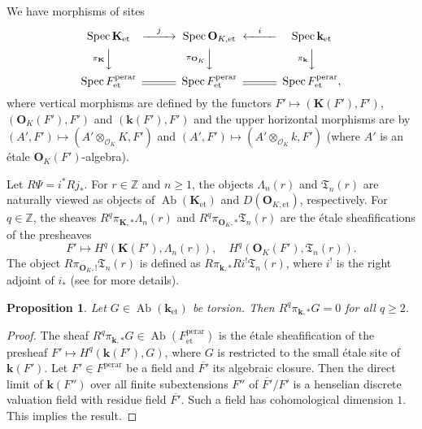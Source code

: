 \documentclass{amsart}
\newtheorem{Prop}[Thm]{Proposition}
\theoremstyle{remark}
\numberwithin{equation}{section}
\newcommand{\Order}{\mathcal{O}}
\newcommand{\tensor}{\mathbin{\otimes}}
\newcommand{\closure}[1]{\overline{#1}}
\newcommand{\Z}{\mathbb{Z}}
\newcommand{\et}{\mathrm{et}}
\newcommand{\perar}{\mathrm{perar}}
\newcommand{\alg}[1]{\mathbf{#1}}
\DeclareMathOperator{\Spec}{Spec}
\DeclareMathOperator{\Ab}{Ab}
\begin{document}
We have morphisms of sites
	\[
		\begin{CD}
				\Spec \alg{K}_{\et}
			@> j >>
				\Spec \alg{O}_{K, \et}
			@< i <<
				\Spec \alg{k}_{\et}
			\\
			@V \pi_{\alg{K}} VV
			@V \pi_{\alg{O}_{K}} VV
			@V \pi_{\alg{k}} VV
			\\
				\Spec F^{\perar}_{\et}
			@=
				\Spec F^{\perar}_{\et}
			@=
				\Spec F^{\perar}_{\et},
		\end{CD}
	\]
where vertical morphisms are defined by the functors
$F' \mapsto (\alg{K}(F'), F')$, $(\alg{O}_{K}(F'), F')$ and $(\alg{k}(F'), F')$
and the upper horizontal morphisms are by
$(A', F') \mapsto (A' \tensor_{\Order_{K}} K, F')$ and
$(A', F') \mapsto (A' \tensor_{\Order_{K}} k, F')$
(where $A'$ is an \'etale $\alg{O}_{K}(F')$-algebra).

Let $R \Psi = i^{\ast} R j_{\ast}$.
For $r \in \Z$ and $n \ge 1$, the objects
$\Lambda_{n}(r)$ and $\mathfrak{T}_{n}(r)$ are naturally viewed as
objects of $\Ab(\alg{K}_{\et})$ and $D(\alg{O}_{K, \et})$, respectively.
For $q \in \Z$, the sheaves $R^{q} \pi_{\alg{K}, \ast} \Lambda_{n}(r)$
and $R^{q} \pi_{\alg{O}_{K}, \ast} \mathfrak{T}_{n}(r)$ are the \'etale sheafifications of the presheaves
	\[
			F'
		\mapsto
			H^{q}(\alg{K}(F'), \Lambda_{n}(r)),
		\quad
			H^{q}(\alg{O}_{K}(F'), \mathfrak{T}_{n}(r)).
	\]
The object $R \pi_{\alg{O}_{K}, !} \mathfrak{T}_{n}(r)$ is defined as
$R \pi_{\alg{k}, \ast} R i^{!} \mathfrak{T}_{n}(r)$,
where $i^{!}$ is the right adjoint of $i_{\ast}$
(see \cite[Section 4.3]{Suz24} for more details).

\begin{Prop} \label{0012}
	Let $G \in \Ab(\alg{k}_{\et})$ be torsion.
	Then $R^{q} \pi_{\alg{k}, \ast} G = 0$ for all $q \ge 2$.
\end{Prop}

\begin{proof}
	The sheaf $R^{q} \pi_{\alg{k}, \ast} G \in \Ab(F^{\perar}_{\et})$ is
	the \'etale sheafification of the presheaf
	$F' \mapsto H^{q}(\alg{k}(F'), G)$,
	where $G$ is restricted to the small \'etale site of $\alg{k}(F')$.
	Let $F' \in F^{\perar}$ be a field
	and $\closure{F'}$ its algebraic closure.
	Then the direct limit of $\alg{k}(F'')$ over all finite subextensions $F''$ of $\closure{F'} / F'$
	is a henselian discrete valuation field with residue field $\closure{F'}$.
	Such a field has cohomological dimension $1$.
	This implies the result.
\end{proof}
\end{document}

